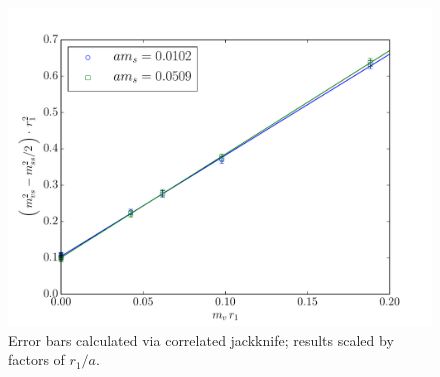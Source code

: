 \documentclass[11pt,a4paper]{article}
\begin{document}
\begin{figure}
\centering
\includegraphics[width=\textwidth]{delta_msq_correlated.pdf}
\caption{Error bars calculated via correlated jackknife; results scaled by factors of $r_1/a$.}
\end{figure}

 
 \clearpage
\end{document}
